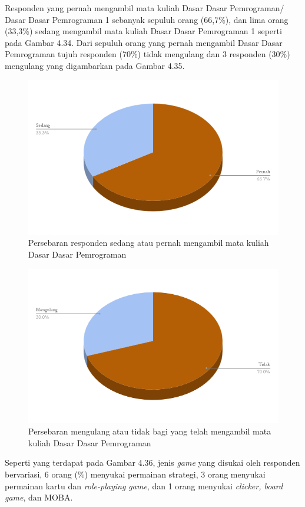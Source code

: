 	Responden yang pernah mengambil mata kuliah Dasar Dasar Pemrograman/ Dasar Dasar Pemrograman 1 sebanyak sepuluh orang (66,7\%), dan lima orang (33,3\%) sedang mengambil mata kuliah Dasar Dasar Pemrograman 1 seperti pada Gambar 4.34. Dari sepuluh orang yang pernah mengambil Dasar Dasar Pemrograman tujuh responden (70\%) tidak mengulang dan 3 responden (30\%) mengulang yang digambarkan pada Gambar 4.35.
	\begin{figure}
		\includegraphics[width=\linewidth]{pics/UT/pernah-sedang}
		\caption{Persebaran responden sedang atau pernah mengambil mata kuliah Dasar Dasar Pemrograman}
		\centering
	\end{figure}
	\begin{figure}
		\includegraphics[width=\linewidth]{pics/UT/mengulang}
		\caption{Persebaran mengulang atau tidak bagi yang telah mengambil mata kuliah Dasar Dasar Pemrograman}
		\centering
	\end{figure}
	Seperti yang terdapat pada Gambar 4.36, jenis \textit{game} yang disukai oleh responden bervariasi, 6 orang (\%) menyukai permainan strategi, 3 orang menyukai permainan kartu dan \textit{role-playing game}, dan 1 orang menyukai \textit{clicker, board game}, dan MOBA.

